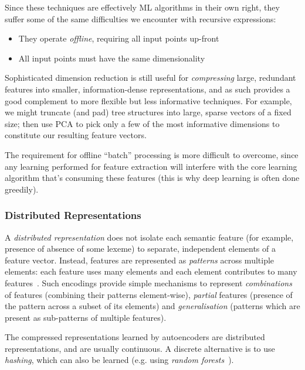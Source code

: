 Since these techniques are effectively ML algorithms in their own right, they
suffer some of the same difficulties we encounter with recursive expressions:

\begin{itemize}
  \item They operate \emph{offline}, requiring all input points up-front
  \item All input points must have the same dimensionality
\end{itemize}

Sophisticated dimension reduction is still useful for \emph{compressing} large,
redundant features into smaller, information-dense representations, and as such
provides a good complement to more flexible but less informative techniques. For
example, we might truncate (and pad) tree structures into large, sparse vectors
of a fixed size; then use PCA to pick only a few of the most informative
dimensions to constitute our resulting feature vectors.

The requirement for offline ``batch'' processing is more difficult to overcome,
since any learning performed for feature extraction will interfere with the
core learning algorithm that's consuming these features (this is why deep
learning is often done greedily).

\subsubsection{Distributed Representations}

A \emph{distributed representation} does not isolate each semantic feature (for
example, presence of absence of some lexeme) to separate, independent elements
of a feature vector. Instead, features are represented as \emph{patterns} across
multiple elements: each feature uses many elements and each element contributes
to many features~\cite{hinton1984distributed}. Such encodings provide simple
mechanisms to represent \emph{combinations} of features (combining their
patterns element-wise), \emph{partial} features (presence of the pattern across
a subset of its elements) and \emph{generalisation} (patterns which are present
as sub-patterns of multiple features).

The compressed representations learned by autoencoders are distributed
representations, and are usually continuous. A discrete alternative is to use
\emph{hashing}, which can also be learned (e.g. using \emph{random
forests}~\cite{vens2011random}).

